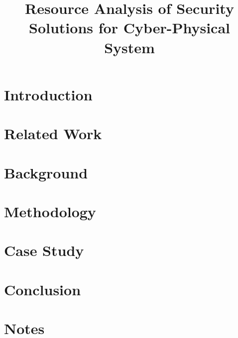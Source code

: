 \documentclass{llncs}
\begin{document}
\title{Resource Analysis of Security Solutions for Cyber-Physical System}



\author{} %





\maketitle
\iffalse
\begin{abstract}


\end{abstract}
\fi


\section{Introduction} \label{sec:intro}



\section{Related Work} \label{sec:related}


\section{Background} \label{sec:attack}



\section{Methodology} \label{sec:method}


\section{Case Study} \label{sec:demo}



\section{Conclusion} \label{sec:conclude}


\section{Notes}\label{sec:notes}

%



\pagebreak


\end{document}
